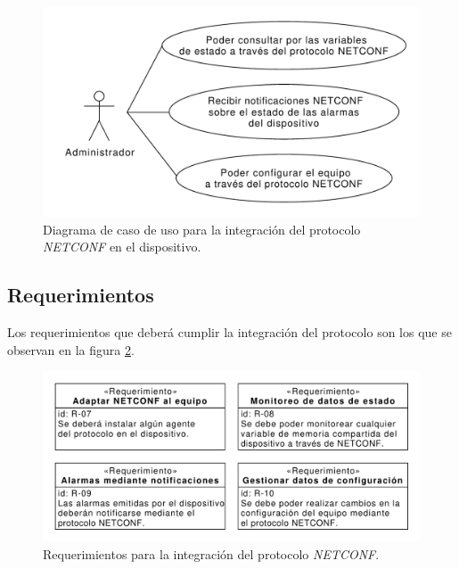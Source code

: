   \begin{figure}[H]
    \centering
    \includegraphics[scale=0.55]{Figures/caso_uso_netconf.pdf}
    \caption{Diagrama de caso de uso para la integración del protocolo \textit{NETCONF} en el dispositivo.}
    \label{fig:diaguso_netconf}
  \end{figure}



  \subsection{Requerimientos}

  Los requerimientos que deberá cumplir la integración del protocolo son los que se observan en la figura \ref{fig:req_netconf}.

  \begin{figure}[H]
    \centering
    \includegraphics[scale=0.65]{Figures/req_netconf.pdf}
    \caption{Requerimientos para la integración del protocolo \textit{NETCONF}.}
    \label{fig:req_netconf}
  \end{figure}


